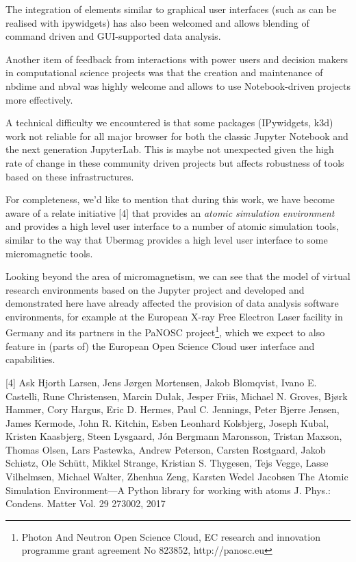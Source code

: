 \documentclass{deliverablereport}
\begin{document}
The integration of elements similar to graphical user interfaces (such
as can be realised with ipywidgets) has also been welcomed and allows
blending of command driven and GUI-supported data analysis.

Another item of feedback from interactions with power users and
decision makers in computational science projects was that the
creation and maintenance of nbdime and nbval was highly welcome and
allows to use Notebook-driven projects more effectively.

A technical difficulty we encountered is that some packages
(IPywidgets, k3d) work not reliable for all major browser for both the
classic Jupyter Notebook and the next generation JupyterLab. This is
maybe not unexpected given the high rate of change in these community
driven projects but affects robustness of tools based on these
infrastructures.

For completeness, we'd like to mention that during this work, we have
become aware of a relate initiative [4] that provides an \emph{atomic
  simulation environment} and provides a high level user interface to
a number of atomic simulation tools, similar to the way that Ubermag
provides a high level user interface to some micromagnetic tools.

Looking beyond the area of micromagnetism, we can see that the model
of virtual research environments based on the Jupyter project and
developed and demonstrated here have already affected the provision of
data analysis software environments, for example at the European X-ray
Free Electron Laser facility in Germany and its partners in the PaNOSC
project\footnote{Photon And Neutron Open Science Cloud, EC research
  and innovation programme grant agreement No 823852,
  http://panosc.eu}, which we expect to also feature in (parts of) the
European Open Science Cloud user interface and capabilities.

[4] Ask Hjorth Larsen, Jens Jørgen Mortensen, Jakob Blomqvist,
Ivano E. Castelli, Rune Christensen, Marcin Dułak, Jesper Friis,
Michael N. Groves, Bjørk Hammer, Cory Hargus, Eric D. Hermes,
Paul C. Jennings, Peter Bjerre Jensen, James Kermode, John R. Kitchin,
Esben Leonhard Kolsbjerg, Joseph Kubal, Kristen Kaasbjerg,
Steen Lysgaard, Jón Bergmann Maronsson, Tristan Maxson, Thomas Olsen,
Lars Pastewka, Andrew Peterson, Carsten Rostgaard, Jakob Schiøtz,
Ole Schütt, Mikkel Strange, Kristian S. Thygesen, Tejs Vegge,
Lasse Vilhelmsen, Michael Walter, Zhenhua Zeng, Karsten Wedel Jacobsen
The Atomic Simulation Environment—A Python library for working with atoms
J. Phys.: Condens. Matter Vol. 29 273002, 2017

\newpage\printbibliography
\end{document}
